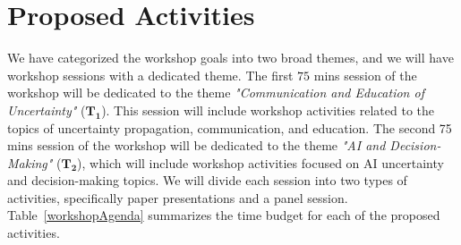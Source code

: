 

\section{Proposed Activities}\label{sec:activities}

We have categorized the workshop goals into two broad themes, and we will have workshop sessions with a dedicated theme. The first $75$ mins session of the workshop will be dedicated to the theme {\em "Communication and Education of Uncertainty"} ($\mathbf{T_1}$). This session will include workshop activities related to the topics of uncertainty propagation, communication, and education. The second 75 mins session of the workshop will be dedicated to the theme {\em "AI and Decision-Making"} ($\mathbf{T_2}$), which will include workshop activities focused on AI uncertainty and decision-making topics. 
We will divide each session into two types of activities, specifically paper presentations and a panel session.  Table~\ref{workshopAgenda} summarizes the time budget for each of the proposed activities. 

\begin{table}[!h]
\centering
\caption{Workshop Agenda}
\label{workshopAgenda}
%
\vspace{-3mm}
\end{table}



